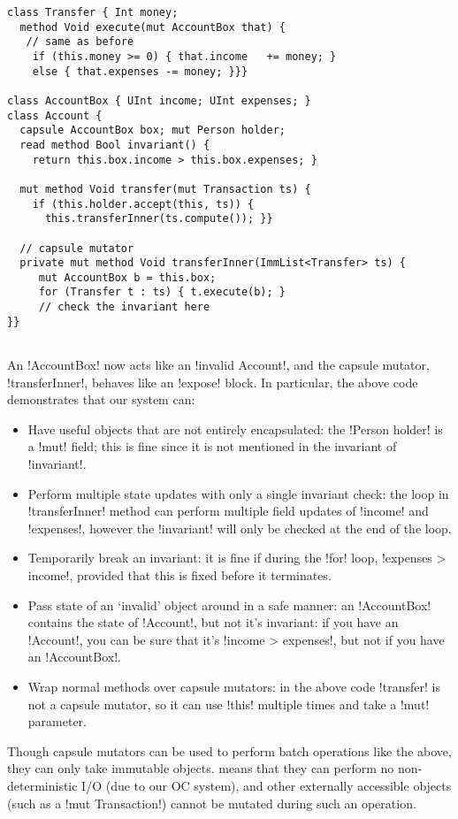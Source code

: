 \begin{lstlisting}
class Transfer { Int money;
  method Void execute(mut AccountBox that) {
   // same as before
    if (this.money >= 0) { that.income   += money; }
    else { that.expenses -= money; }}}

class AccountBox { UInt income; UInt expenses; }
class Account {
  capsule AccountBox box; mut Person holder;
  read method Bool invariant() {
    return this.box.income > this.box.expenses; }
    
  mut method Void transfer(mut Transaction ts) {
    if (this.holder.accept(this, ts)) {
	  this.transferInner(ts.compute()); }}

  // capsule mutator
  private mut method Void transferInner(ImmList<Transfer> ts) {
     mut AccountBox b = this.box;
     for (Transfer t : ts) { t.execute(b); }
     // check the invariant here
}}
     
\end{lstlisting}
An \Q!AccountBox! now acts like an \Q!invalid Account!, and the capsule mutator, \Q!transferInner!, behaves like an \Q!expose! block. In particular, the above code demonstrates that our system can:
\begin{itemize}
\item Have useful objects that are not entirely encapsulated: the \Q!Person holder! is a \Q!mut! field; this is fine since it is not mentioned in the invariant of \Q!invariant!.
\item Perform multiple state updates with only a single invariant check: the loop in \Q!transferInner! method can perform multiple field updates of \Q!income! and \Q!expenses!, however the \Q!invariant! will only be checked at the end of the loop.
\item Temporarily break an invariant: it is fine if during the \Q!for! loop, \Q!expenses > income!, provided that this is fixed before it terminates.
\item Pass state of an `invalid' object around in a safe manner: an \Q!AccountBox! contains the state of \Q!Account!, but not it's invariant: if you have an \Q!Account!, you can be sure that it's \Q!income > expenses!, but not if you have an \Q!AccountBox!.
\item Wrap normal methods over capsule mutators: in the above code \Q!transfer! is not a capsule mutator, so it can use \Q!this! multiple times and take a \Q!mut! parameter.
\end{itemize}

Though capsule mutators can be used to perform batch operations like the above, they can only take immutable objects.  means that they can perform no non-deterministic I/O (due to our OC system), and other externally accessible objects (such as a \Q!mut Transaction!) cannot be mutated during such an operation.


